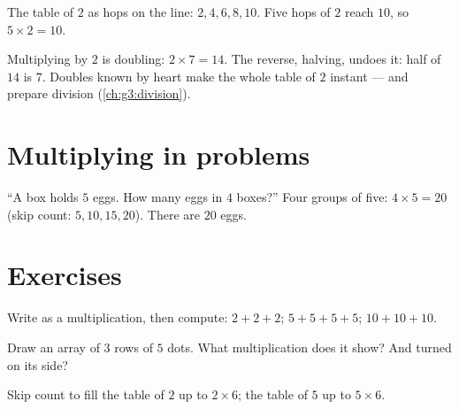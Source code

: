 \begin{omfigure}

{\small The table of $2$ as hops on the line: $2, 4, 6, 8, 10$. Five
hops of $2$ reach $10$, so $5 \times 2 = 10$.}
\end{omfigure}

\begin{example}\label{ex:g2:mult:double}
Multiplying by $2$ is doubling: $2 \times 7 = 14$. The reverse,
halving, undoes it: half of $14$ is $7$. Doubles known by heart
make the whole table of $2$ instant --- and prepare division
(\cref{ch:g3:division}).
\end{example}

\section{Multiplying in problems}

\begin{example}\label{ex:g2:mult:problem}
``A box holds $5$ eggs. How many eggs in $4$ boxes?'' Four groups of
five: $4 \times 5 = 20$ (skip count: $5, 10, 15, 20$). There are
$20$ eggs.
\end{example}

\section{Exercises}

\begin{exercise}[$\star$]\label{exo:g2:mult:1}
Write as a multiplication, then compute: $2 + 2 + 2$; \quad
$5 + 5 + 5 + 5$; \quad $10 + 10 + 10$.
\end{exercise}

\begin{exercise}[$\star$]\label{exo:g2:mult:2}
Draw an array of $3$ rows of $5$ dots. What multiplication does it
show? And turned on its side?
\end{exercise}

\begin{exercise}[$\star$]\label{exo:g2:mult:3}
Skip count to fill the table of $2$ up to $2 \times 6$; the table
of $5$ up to $5 \times 6$.
\end{exercise}

